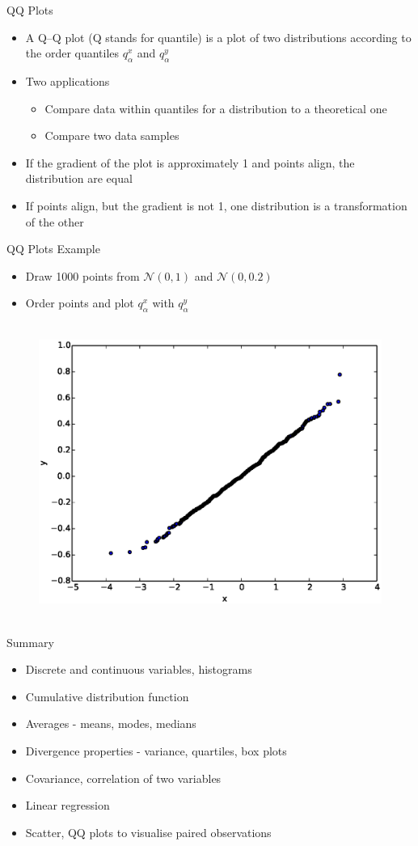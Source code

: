 \documentclass{beamer}
\begin{document}
\begin{frame}{QQ Plots} 
\begin{itemize}
 \item A Q–Q plot (Q stands for quantile) is a plot of two distributions according to the order quantiles $q_\alpha^x$ and $q_\alpha^y$
 \item Two applications 
 \begin{itemize}
 \item Compare data within quantiles for a distribution to a theoretical one 
 \item Compare two data samples 
 \end{itemize}
 \item If the gradient of the plot is approximately 1 and points align, the distribution are equal 
 \item If points align, but the gradient is not 1, one distribution is a transformation of the other 
\end{itemize}
\end{frame}

\begin{frame}{QQ Plots Example}  
\begin{itemize}
 \item Draw 1000 points from $\mathcal{N}(0, 1)$ and $\mathcal{N}(0, 0.2)$ 
\item Order points and plot $q_\alpha^x$ with $q_\alpha^y$
\end{itemize}

   \begin{figure}[htp]
\mbox{
\includegraphics[width=0.5\linewidth]{QQPlot.eps}
}
\end{figure} 
\end{frame}

\begin{frame}{Summary} 
\begin{itemize} 
 \item Discrete and continuous variables, histograms  
 \item Cumulative distribution function 
\item Averages - means, modes, medians 
\item Divergence properties - variance, quartiles, box plots  
\item Covariance, correlation of two variables
\item Linear regression 
\item Scatter, QQ plots to visualise paired observations 
\end{itemize}
\end{frame}
\end{document}
